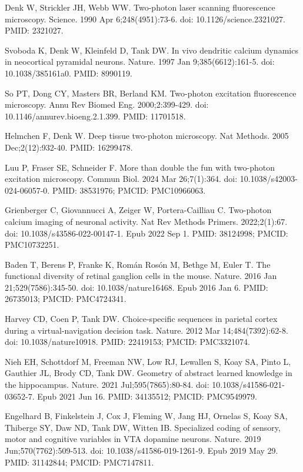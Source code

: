 \documentclass[10pt,letterpaper]{article}
\begin{document}
\nolinenumbers

\begin{thebibliography}{10}

Denk W, Strickler JH, Webb WW. Two-photon laser scanning fluorescence microscopy. Science. 1990 Apr 6;248(4951):73-6. doi: 10.1126/science.2321027. PMID: 2321027.

Svoboda K, Denk W, Kleinfeld D, Tank DW. In vivo dendritic calcium dynamics in neocortical pyramidal neurons. Nature. 1997 Jan 9;385(6612):161-5. doi: 10.1038/385161a0. PMID: 8990119.

So PT, Dong CY, Masters BR, Berland KM. Two-photon excitation fluorescence microscopy. Annu Rev Biomed Eng. 2000;2:399-429. doi: 10.1146/annurev.bioeng.2.1.399. PMID: 11701518.

Helmchen F, Denk W. Deep tissue two-photon microscopy. Nat Methods. 2005 Dec;2(12):932-40. PMID: 16299478.

Luu P, Fraser SE, Schneider F. More than double the fun with two-photon excitation microscopy. Commun Biol. 2024 Mar 26;7(1):364. doi: 10.1038/s42003-024-06057-0. PMID: 38531976; PMCID: PMC10966063.

Grienberger C, Giovannucci A, Zeiger W, Portera-Cailliau C. Two-photon calcium imaging of neuronal activity. Nat Rev Methods Primers. 2022;2(1):67. doi: 10.1038/s43586-022-00147-1. Epub 2022 Sep 1. PMID: 38124998; PMCID: PMC10732251.

Baden T, Berens P, Franke K, Román Rosón M, Bethge M, Euler T. The functional diversity of retinal ganglion cells in the mouse. Nature. 2016 Jan 21;529(7586):345-50. doi: 10.1038/nature16468. Epub 2016 Jan 6. PMID: 26735013; PMCID: PMC4724341.

Harvey CD, Coen P, Tank DW. Choice-specific sequences in parietal cortex during a virtual-navigation decision task. Nature. 2012 Mar 14;484(7392):62-8. doi: 10.1038/nature10918. PMID: 22419153; PMCID: PMC3321074.

Nieh EH, Schottdorf M, Freeman NW, Low RJ, Lewallen S, Koay SA, Pinto L, Gauthier JL, Brody CD, Tank DW. Geometry of abstract learned knowledge in the hippocampus. Nature. 2021 Jul;595(7865):80-84. doi: 10.1038/s41586-021-03652-7. Epub 2021 Jun 16. PMID: 34135512; PMCID: PMC9549979.

Engelhard B, Finkelstein J, Cox J, Fleming W, Jang HJ, Ornelas S, Koay SA, Thiberge SY, Daw ND, Tank DW, Witten IB. Specialized coding of sensory, motor and cognitive variables in VTA dopamine neurons. Nature. 2019 Jun;570(7762):509-513. doi: 10.1038/s41586-019-1261-9. Epub 2019 May 29. PMID: 31142844; PMCID: PMC7147811.


\end{thebibliography}
\end{document}

